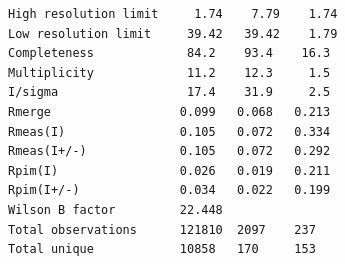 \documentclass[slides,compress]{beamer}
\begin{document}
\begin{frame}[fragile]
\begin{verbatim}
High resolution limit     1.74    7.79    1.74
Low resolution limit     39.42   39.42    1.79
Completeness             84.2    93.4    16.3
Multiplicity             11.2    12.3     1.5
I/sigma                  17.4    31.9     2.5
Rmerge                  0.099   0.068   0.213
Rmeas(I)                0.105   0.072   0.334
Rmeas(I+/-)             0.105   0.072   0.292
Rpim(I)                 0.026   0.019   0.211
Rpim(I+/-)              0.034   0.022   0.199
Wilson B factor         22.448
Total observations      121810  2097    237
Total unique            10858   170     153
\end{verbatim}
\end{frame}

\end{document}

